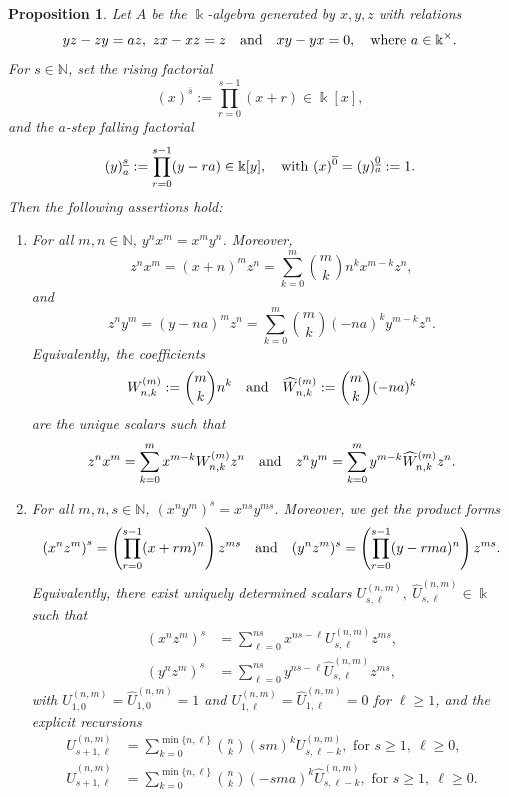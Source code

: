 \documentclass{amsart}
\newtheorem{proposition}[theorem]{Proposition}
\theoremstyle{definition}
\theoremstyle{remark}
\numberwithin{equation}{section}
\begin{document}
\begin{proposition}\label{Case(5)(v)}
Let $A$ be the $\Bbbk$-algebra generated by $x,y,z$ with relations
\[
yz - zy= az,\ zx - xz = z \quad {\rm and} \quad xy - yx = 0, \quad {\rm where} \ a\in\Bbbk^{\times}. 
\]
For $s\in\mathbb N$, set the rising factorial
\[
(x)^{\overline{s}}:=\prod_{r=0}^{s-1}(x+r)\in\Bbbk[x],
\]
and the $a$-step falling factorial
\[
\left(y\right)^{\underline{s}}_{a}:=\prod_{r=0}^{s-1}(y-ra)\in\Bbbk[y], \quad {\rm with} \, \, (x)^{\overline{0}}=(y)^{\underline{0}}_{a}:=1.
\]
Then the following assertions hold:
\begin{enumerate}
\item[\rm (1)] For all $m,n\in\mathbb N$, $y^n x^m=x^m y^n$. Moreover,
\begin{equation}\label{znxmcase5v}
z^n x^m=(x+n)^m z^n=\sum_{k=0}^{m}\binom{m}{k} n^{k} x^{m-k} z^n,
\end{equation}
and
\begin{equation}\label{znymcase5v}
z^n y^m = \left(y - na\right)^m z^n = \sum_{k=0}^{m}\binom{m}{k} (-na)^{k} y^{m-k} z^n.
\end{equation}
Equivalently, the coefficients
\[
W^{(m)}_{n,k}:=\binom{m}{k}n^{k} \quad {\rm and} \quad \widehat W^{(m)}_{n,k}:=\binom{m}{k}(-na)^{k}
\]
are the unique scalars such that
$$
z^n x^m = \sum_{k=0}^{m}x^{m-k}W^{(m)}_{n,k}z^n \quad {\rm and} \quad z^n y^m = \sum_{k=0}^{m}y^{m-k}\widehat W^{(m)}_{n,k}z^n.
$$

\item[\rm (2)] For all $m,n,s\in\mathbb N$, $\left(x^n y^m\right)^s = x^{ns}y^{ms}$. Moreover, we get the product forms
\begin{equation}\label{xnzmpowercase5v}
\left(x^n z^m\right)^s = \left(\prod_{r=0}^{s-1}(x+rm)^n\right) z^{ms} \quad {\rm and} \quad (y^n z^m)^s = \left(\prod_{r=0}^{s-1}(y-rma)^n\right) z^{ms}.
\end{equation}
Equivalently, there exist uniquely determined scalars
$U^{(n,m)}_{s,\ell},\ \widehat U^{(n,m)}_{s,\ell}\in\Bbbk$ such that
\begin{align}
\left(x^n z^m\right)^s & = \sum_{\ell=0}^{ns}x^{ns-\ell} U^{(n,m)}_{s,\ell} z^{ms},\label{Udefcase5v}\\
\left(y^n z^m\right)^s & = \sum_{\ell=0}^{ns}y^{ns-\ell} \widehat U^{(n,m)}_{s,\ell} z^{ms},\label{Uhatdefcase5v}
\end{align}
with $U^{(n,m)}_{1,0}=\widehat U^{(n,m)}_{1,0}=1$ and $U^{(n,m)}_{1,\ell}=\widehat U^{(n,m)}_{1,\ell}=0$ for $\ell\ge 1$, and the explicit recursions
\begin{align}
U^{(n,m)}_{s+1,\ell}
&=\sum_{k=0}^{\min\{n,\ell\}}\binom{n}{k}(sm)^{k} U^{(n,m)}_{s,\ell-k}, \text{ for } s\ge 1,\ \ell\ge 0,\label{Ureccase5v}\\
\widehat U^{(n,m)}_{s+1,\ell}
&=\sum_{k=0}^{\min\{n,\ell\}}\binom{n}{k}(-sma)^{k} \widehat U^{(n,m)}_{s,\ell-k}, \text{ for } s\ge 1,\ \ell\ge 0.\label{Uhatreccase5v}
\end{align}


\end{enumerate}
\end{proposition}
\end{document}
